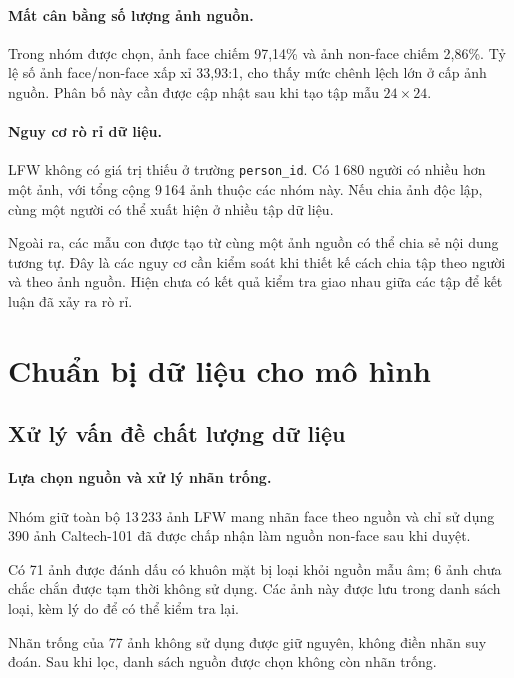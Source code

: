 \documentclass[12pt,a4paper,oneside]{report}
\begin{document}
\paragraph{Mất cân bằng số lượng ảnh nguồn.}

Trong nhóm được chọn, ảnh face chiếm 97,14\%
và ảnh non-face chiếm 2,86\%.
Tỷ lệ số ảnh face/non-face xấp xỉ 33,93:1,
cho thấy mức chênh lệch lớn ở cấp ảnh nguồn.
Phân bố này cần được cập nhật sau khi tạo
tập mẫu $24 \times 24$.

\paragraph{Nguy cơ rò rỉ dữ liệu.}

LFW không có giá trị thiếu ở trường \texttt{person\_id}.
Có 1\,680 người có nhiều hơn một ảnh,
với tổng cộng 9\,164 ảnh thuộc các nhóm này.
Nếu chia ảnh độc lập, cùng một người có thể xuất hiện
ở nhiều tập dữ liệu.

Ngoài ra, các mẫu con được tạo từ cùng một ảnh nguồn
có thể chia sẻ nội dung tương tự.
Đây là các nguy cơ cần kiểm soát khi thiết kế
cách chia tập theo người và theo ảnh nguồn.
Hiện chưa có kết quả kiểm tra giao nhau giữa
các tập để kết luận đã xảy ra rò rỉ.

\section{Chuẩn bị dữ liệu cho mô hình}
\subsection{Xử lý vấn đề chất lượng dữ liệu}

\paragraph{Lựa chọn nguồn và xử lý nhãn trống.}

Nhóm giữ toàn bộ 13\,233 ảnh LFW mang nhãn face
theo nguồn và chỉ sử dụng 390 ảnh Caltech-101
đã được chấp nhận làm nguồn non-face sau khi duyệt.

Có 71 ảnh được đánh dấu có khuôn mặt bị loại
khỏi nguồn mẫu âm; 6 ảnh chưa chắc chắn được
tạm thời không sử dụng.
Các ảnh này được lưu trong danh sách loại,
kèm lý do để có thể kiểm tra lại.

Nhãn trống của 77 ảnh không sử dụng được giữ nguyên,
không điền nhãn suy đoán.
Sau khi lọc, danh sách nguồn được chọn
không còn nhãn trống.
\end{document}
